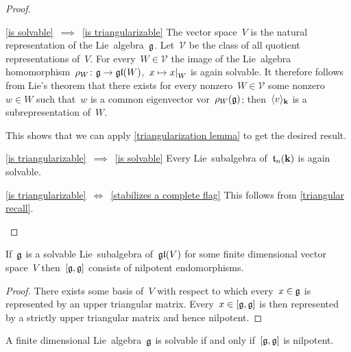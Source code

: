 \begin{proof}
  \leavevmode
  \begin{implicationlist}
    \item[\ref*{is solvable}~$\implies$~\ref*{is triangularizable}]
      The vector space~$V$ is the natural representation of the Lie~algebra~$\mathfrak{g}$.
      Let~$\mathcal{V}$ be the class of all quotient representations of~$V$.
      For every~$W \in \mathcal{V}$ the image of the Lie~algebra homomorphism~$\rho_W \colon\mathfrak{g} \to \mathfrak{gl}(W)$,~$x \mapsto \restrict{x}{W}$ is again solvable.
      It therefore follows from Lie’s theorem that there exists for every nonzero~$W \in \mathcal{V}$ some nonzero~$w \in W$ such that~$w$ is a common eigenvector vor~$\rho_W(\mathfrak{g})$;
      then~$\langle v\rangle_{\mathbf{k}}$ is a {\onedimensional} subrepresentation of~$W$.
      
      This shows that we can apply \cref{triangularization lemma} to get the desired result.
    \item[\ref*{is triangularizable}~$\implies$~\ref*{is solvable}]
      Every Lie~subalgebra of~$\mathfrak{t}_n(\mathbf{k})$ is again solvable.
    \item[\ref*{is triangularizable}~$\iff$~\ref*{stabilizes a complete flag}]
      This follows from \cref{triangular recall}.
    \qedhere
  \end{implicationlist}
\end{proof}


\begin{corollary}
  \label{solvable linear lie algebra has commutator consisting of nilpotent endomorphisms}
  If~$\mathfrak{g}$ is a solvable Lie~subalgebra of~$\mathfrak{gl}(V)$ for some finite dimensional vector space~$V$ then~$[\mathfrak{g}, \mathfrak{g}]$ consists of nilpotent endomorphisms.
\end{corollary}


\begin{proof}
  There exists some basis of~$V$ with respect to which every~$x \in \mathfrak{g}$ is represented by an upper triangular matrix.
  Every~$x \in [\mathfrak{g}, \mathfrak{g}]$ is then represented by a strictly upper triangular matrix and hence nilpotent.
\end{proof}


\begin{corollary}
  \label{solvable iff derived is nilpotent}
  A finite dimensional Lie~algebra~$\mathfrak{g}$ is solvable if and only if~$[\mathfrak{g}, \mathfrak{g}]$ is nilpotent.
\end{corollary}


